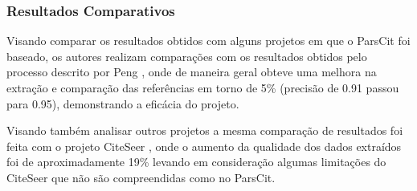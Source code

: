 \subsubsection{Resultados Comparativos}

Visando comparar os resultados obtidos com alguns projetos em que o ParsCit foi baseado, os autores realizam comparações com os resultados obtidos pelo processo descrito por Peng \cite{Peng-CRF-IE}, onde de maneira geral obteve uma melhora na extração e comparação das referências em torno de 5\% (precisão de 0.91 passou para 0.95), demonstrando a eficácia do projeto.

Visando também analisar outros projetos a mesma comparação de resultados foi feita com o projeto CiteSeer \cite{citeseer}, onde o aumento da qualidade dos dados extraídos foi de aproximadamente 19\% levando em consideração algumas limitações do CiteSeer que não são compreendidas como no ParsCit.


	
